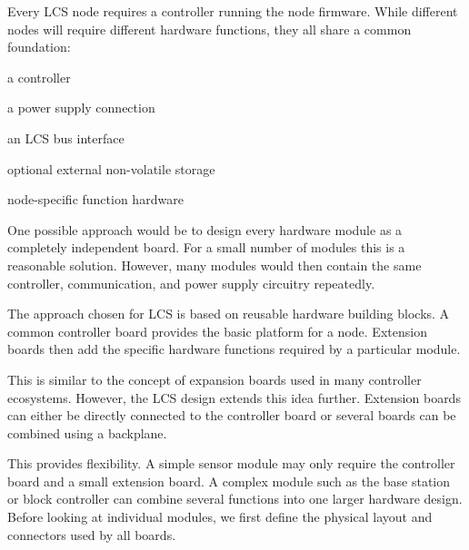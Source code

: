 
Every LCS node requires a controller running the node firmware. While different nodes will require 
different hardware functions, they all share a common foundation:

\begin{smallGapItemize}
\item a controller
\item a power supply connection
\item an LCS bus interface
\item optional external non-volatile storage
\item node-specific function hardware
\end{smallGapItemize}

One possible approach would be to design every hardware module as a completely independent board. 
For a small number of modules this is a reasonable solution. However, many modules would then 
contain the same controller, communication, and power supply circuitry repeatedly.

The approach chosen for LCS is based on reusable hardware building blocks. A common controller board 
provides the basic platform for a node. Extension boards then add the specific hardware functions 
required by a particular module.

This is similar to the concept of expansion boards used in many controller ecosystems. However, the 
LCS design extends this idea further. Extension boards can either be directly connected to the 
controller board or several boards can be combined using a backplane.

This provides flexibility. A simple sensor module may only require the controller board and a small 
extension board. A complex module such as the base station or block controller can combine several 
functions into one larger hardware design.
Before looking at individual modules, we first define the physical layout and connectors used by all 
boards.

